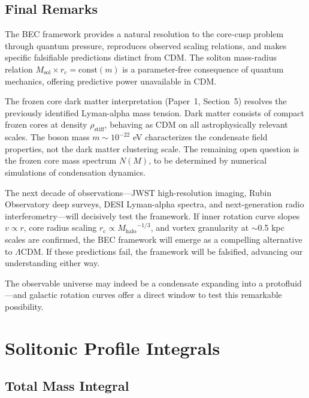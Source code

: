 \documentclass[11pt,a4paper]{article}
\newcommand{\rhostiff}{\ensuremath{\rho_{\mathrm{stiff}}}}
\newcommand{\Msol}{\ensuremath{M_{\mathrm{sol}}}}
\newcommand{\Mhalo}{\ensuremath{M_{\mathrm{halo}}}}
\newcommand{\rc}{\ensuremath{r_{\mathrm{c}}}}
\theoremstyle{definition}
\theoremstyle{remark}
\begin{document}
\subsection{Final Remarks}
\label{sec:final_remarks}

The BEC framework provides a natural resolution to the core-cusp problem through quantum pressure, reproduces observed scaling relations, and makes specific falsifiable predictions distinct from CDM. The soliton mass-radius relation $\Msol \times \rc = \text{const}(m)$ is a parameter-free consequence of quantum mechanics, offering predictive power unavailable in CDM.

The frozen core dark matter interpretation (Paper~1, Section~5) resolves the previously identified Lyman-alpha mass tension. Dark matter consists of compact frozen cores at density $\rhostiff$, behaving as CDM on all astrophysically relevant scales. The boson mass $m \sim 10^{-22}$ eV characterizes the condensate field properties, not the dark matter clustering scale. The remaining open question is the frozen core mass spectrum $N(M)$, to be determined by numerical simulations of condensation dynamics.

The next decade of observations---JWST high-resolution imaging, Rubin Observatory deep surveys, DESI Lyman-alpha spectra, and next-generation radio interferometry---will decisively test the framework. If inner rotation curve slopes $v \propto r$, core radius scaling $\rc \propto \Mhalo^{-1/3}$, and vortex granularity at $\sim$0.5 kpc scales are confirmed, the BEC framework will emerge as a compelling alternative to $\Lambda$CDM. If these predictions fail, the framework will be falsified, advancing our understanding either way.

The observable universe may indeed be a condensate expanding into a protofluid---and galactic rotation curves offer a direct window to test this remarkable possibility.

\appendix

\section{Solitonic Profile Integrals}
\label{app:integrals}

\subsection{Total Mass Integral}
\end{document}
